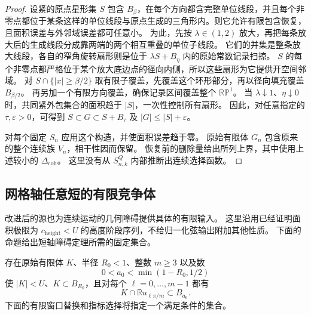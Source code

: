 \begin{proof}
设紧的原点星形集 $S$ 包含 $B_\beta$，在每个方向都含完整单位线段，并且每个非零点都位于某条这样的单位线段与原点生成的三角形内。则它允许有限包含恢复，且面积误差与外邻域误差都可任意小。
为此，先按 $\lambda\in(1,2)$ 放大，再把每条放大后的生成线段分成靠两端的两个相互重叠的单位子线段。
它们的并集是整条放大线段，各自的窄角旋转扇形则是位于 $\lambda S+B_\eta$ 内的原始常数记录扫掠。
$S$ 的每个非零点都严格位于某个放大底边点的径向内侧，所以这些扇形为它提供开空间邻域。
对 $S\cap\{|x|\ge\beta/2\}$ 取有限子覆盖，先覆盖这个环形部分，再以径向填充覆盖 $B_{\beta/2}$。
再另加一个有限方向覆盖，确保记录区间覆盖整个 $\mathbb {RP}^1$。
当 $\lambda\downarrow1$、$\eta\downarrow0$ 时，共同紧外包集合的面积趋于 $|S|$，一次性控制所有扇形。
因此，对任意指定的 $\tau,\varepsilon>0$，可得到 $S\subset G\subset S+B_\tau$ 及 $|G|\le|S|+\varepsilon$。

对每个固定 $S_n$ 应用这个构造，并使面积误差趋于零。
原始有限体 $G_n$ 包含原来的整个连续族 $V_n$，相干性因而保留。
恢复前的删除量给出所列上界，其中使用上述较小的 $\Delta_{\mathrm{coh}}$。
这里没有从 $S^Q_{n,k}$ 内部推断出连续选择函数。
\end{proof}

\subsection{网格轴任意短的有限竞争体}
\label{subsec:upper-short-axes}

改进后的源也为连续运动的几何障碍提供具体的有限输入。
这里沿用已经证明面积极限为 $c_{\mathrm{height}}<U$ 的高度阶段序列，不给归一化弦输出附加其他性质。
下面的命题给出短轴障碍定理所需的固定集合。

\begin{proposition}[一个原始有限竞争短轴体]
\label{prop:upper-short-axis-example}
存在原始有限体 $K$、半径 $R_0<1$、整数 $m\ge3$ 以及数
\[
 0<a_0<\min(1-R_0,1/2)
\]
使 $|K|<U$、$K\subset B_{R_0}$，且对每个 $\ell=0,\ldots,m-1$ 都有
\[
 K\cap\mathbb R u_{\ell\pi/m}\subset B_{a_0}.
\]
下面的有限窗口替换和指标选择将指定一个满足条件的集合。
\end{proposition}

